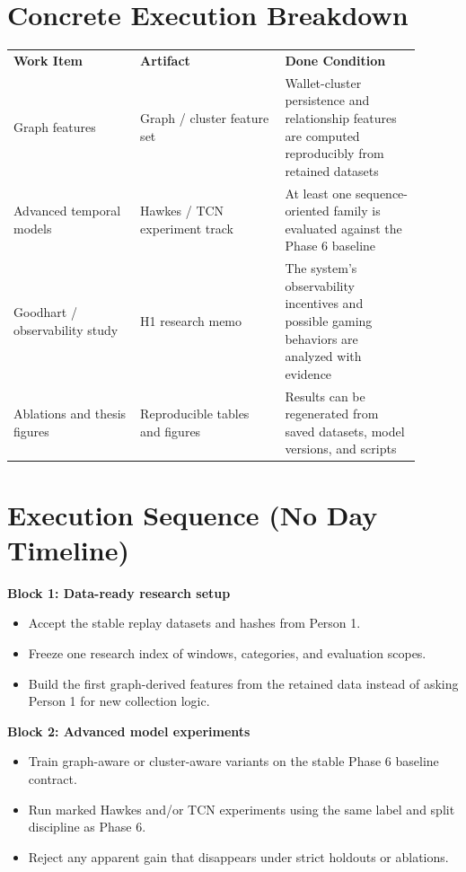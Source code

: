 \documentclass{article}
\begin{document}
\section*{Concrete Execution Breakdown}
\begin{longtable}{p{0.28\linewidth}p{0.32\linewidth}p{0.30\linewidth}}
\textbf{Work Item} & \textbf{Artifact} & \textbf{Done Condition} \\
Graph features & Graph / cluster feature set & Wallet-cluster persistence and relationship features are computed reproducibly from retained datasets \\
Advanced temporal models & Hawkes / TCN experiment track & At least one sequence-oriented family is evaluated against the Phase 6 baseline \\
Goodhart / observability study & H1 research memo & The system's observability incentives and possible gaming behaviors are analyzed with evidence \\
Ablations and thesis figures & Reproducible tables and figures & Results can be regenerated from saved datasets, model versions, and scripts \\
\end{longtable}

\section*{Execution Sequence (No Day Timeline)}
\textbf{Block 1: Data-ready research setup}
\begin{itemize}
\item Accept the stable replay datasets and hashes from Person 1.
\item Freeze one research index of windows, categories, and evaluation scopes.
\item Build the first graph-derived features from the retained data instead of asking Person 1 for new collection logic.
\end{itemize}

\textbf{Block 2: Advanced model experiments}
\begin{itemize}
\item Train graph-aware or cluster-aware variants on the stable Phase 6 baseline contract.
\item Run marked Hawkes and/or TCN experiments using the same label and split discipline as Phase 6.
\item Reject any apparent gain that disappears under strict holdouts or ablations.
\end{itemize}
\end{document}
